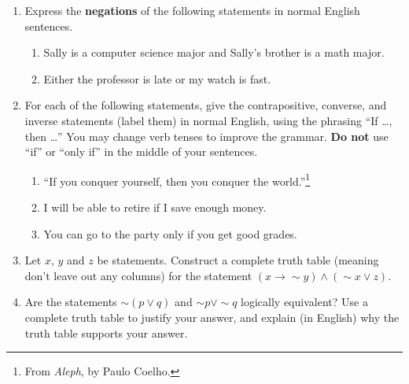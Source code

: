\documentclass[11pt, letterpaper]{report}
\newcommand{\nott}{{\sim}}
\begin{document}
\begin{enumerate}
	\item Express the \textbf{negations} of the following statements in normal English sentences.
	\begin{enumerate}
		\item Sally is a computer science major and Sally's brother is a math major.
		\item Either the professor is late or my watch is fast.
	\end{enumerate}
	
	\item For each of the following statements, give the contrapositive, converse, and
	inverse statements (label them) in normal English, using the phrasing ``If \ldots, then \ldots''   
	You may change verb tenses to improve
	the grammar.  \textbf{Do not} use ``if'' or ``only if'' in the middle of your sentences.
	\begin{enumerate}
		\item ``If you conquer yourself, then you conquer the world.''\footnote{From \emph{Aleph}, by Paulo Coelho.}				
		\item I will be able to retire if I save enough money.
		\item You can go to the party only if you get good grades.
		
	\end{enumerate}
	
	\item Let $x$, $y$ and $z$ be statements.  Construct a complete truth table (meaning don't leave out any columns) for the 
	statement $(x \to \nott y) \land (\nott x \lor z)$.
	
	\item Are the statements $\nott (p \lor q)$ and $\nott p \lor \nott q$ logically equivalent?  Use a complete truth table to justify
	your answer, and explain (in English) why the truth table supports your answer.

\end{enumerate}
\end{document}
